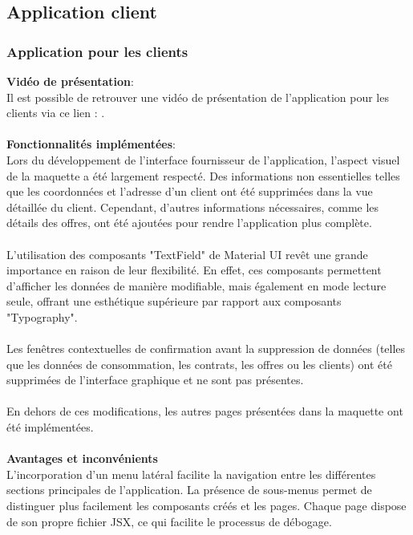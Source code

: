 \documentclass[../rapport.tex]{subfiles}
\begin{document}
\subsection{Application client}
\subsubsection{Application pour les clients}
\noindent \textbf{Vidéo de présentation}: \\ 
Il est possible de retrouver une vidéo de présentation de l'application pour les clients via ce lien : . \\ \\
\textbf{Fonctionnalités implémentées}: \\
Lors du développement de l'interface fournisseur de l'application, l'aspect visuel de la maquette a été largement respecté. Des informations non essentielles telles que les coordonnées et l'adresse d'un client ont été supprimées dans la vue détaillée du client. Cependant, d'autres informations nécessaires, comme les détails des offres, ont été ajoutées pour rendre l'application plus complète. \\ \\
L'utilisation des composants "TextField" de Material UI revêt une grande importance en raison de leur flexibilité. En effet, ces composants permettent d'afficher les données de manière modifiable, mais également en mode lecture seule, offrant une esthétique supérieure par rapport aux composants "Typography". \\ \\
Les fenêtres contextuelles de confirmation avant la suppression de données (telles que les données de consommation, les contrats, les offres ou les clients) ont été supprimées de l'interface graphique et ne sont pas présentes. \\ \\
En dehors de ces modifications, les autres pages présentées dans la maquette ont été implémentées.
\\ \\
\textbf{Avantages et inconvénients} \\
L'incorporation d'un menu latéral facilite la navigation entre les différentes sections principales de l'application. La présence de sous-menus permet de distinguer plus facilement les composants créés et les pages. Chaque page dispose de son propre fichier JSX, ce qui facilite le processus de débogage. \\ \\
\end{document}
